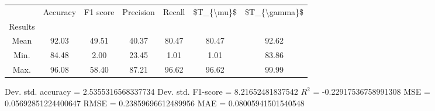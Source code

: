 \begin{tabular}{|c|c|c|c|c|c|c|}
\toprule
{} &  Accuracy &  F1 score &  Precision &  Recall &  \$T\_\{\textbackslash mu\}\$ &  \$T\_\{\textbackslash gamma\}\$ \\
Results &           &           &            &         &            &               \\
\hline
Mean    &     92.03 &     49.51 &      40.37 &   80.47 &      80.47 &         92.62 \\
Min.    &     84.48 &      2.00 &      23.45 &    1.01 &       1.01 &         83.86 \\
Max.    &     96.08 &     58.40 &      87.21 &   96.62 &      96.62 &         99.99 \\
\bottomrule
\end{tabular}

 Dev. std. accuracy = 2.5355316568337734
 Dev. std. F1-score = 8.21652481837542
 $R^2$ = -0.22917536758991308
 MSE = 0.05692851224400647
 RMSE = 0.23859696612489956
 MAE = 0.08005941501540548